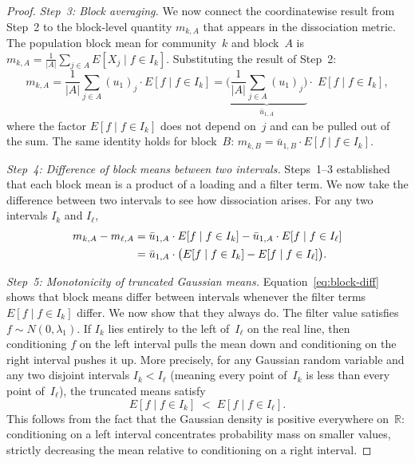 \documentclass[hidelinks]{siamart251216}
\newcommand{\R}{\mathbb{R}}
\begin{document}
\begin{proof}
  \emph{Step~3: Block averaging.}
  We now connect the coordinatewise result from Step~2 to the
  block-level quantity $m_{k,A}$ that appears in the dissociation
  metric.  The population block mean for community~$k$ and block~$A$ is
  $m_{k,A} = \frac{1}{|A|}\sum_{j \in A} E[X_j \mid f \in I_k]$.
  Substituting the result of Step~2:
  \[
    m_{k,A}
    = \frac{1}{|A|}\sum_{j \in A} (u_1)_j \cdot E[f \mid f \in I_k]
    = \underbrace{\biggl(\frac{1}{|A|}\sum_{j \in A}
      (u_1)_j\biggr)}_{\bar{u}_{1,A}}
      \cdot\; E[f \mid f \in I_k],
  \]
  where the factor $E[f \mid f \in I_k]$ does not depend on~$j$ and
  can be pulled out of the sum.  The same identity holds for block~$B$:
  $m_{k,B} = \bar{u}_{1,B} \cdot E[f \mid f \in I_k]$.

  \emph{Step~4: Difference of block means between two intervals.}
  Steps~1--3 established that each block mean is a product of a loading
  and a filter term.  We now take the difference between two intervals
  to see how dissociation arises.  For any two intervals $I_k$
  and $I_\ell$,
  \begin{align}
    m_{k,A} - m_{\ell,A}
    &= \bar{u}_{1,A} \cdot E[f \mid f \in I_k]
       - \bar{u}_{1,A} \cdot E[f \mid f \in I_\ell] \notag \\
    &= \bar{u}_{1,A} \cdot
       \bigl(E[f \mid f \in I_k] - E[f \mid f \in I_\ell]\bigr).
       \label{eq:block-diff}
  \end{align}

  \emph{Step~5: Monotonicity of truncated Gaussian means.}
  Equation~\eqref{eq:block-diff} shows that block means differ between
  intervals whenever the filter terms $E[f \mid f \in I_k]$ differ.
  We now show that they always do.
  The filter value satisfies $f \sim N(0, \lambda_1)$.  If $I_k$ lies
  entirely to the left of~$I_\ell$ on the real line, then conditioning
  $f$ on the left interval pulls the mean down and conditioning on the
  right interval pushes it up.  More precisely, for any Gaussian random
  variable and any two disjoint intervals $I_k < I_\ell$ (meaning every
  point of~$I_k$ is less than every point of~$I_\ell$), the truncated
  means satisfy
  \[
    E[f \mid f \in I_k] \;<\; E[f \mid f \in I_\ell].
  \]
  This follows from the fact that the Gaussian density is positive
  everywhere on~$\R$: conditioning on a left interval concentrates
  probability mass on smaller values, strictly decreasing the mean
  relative to conditioning on a right interval.


\end{proof}
\end{document}
